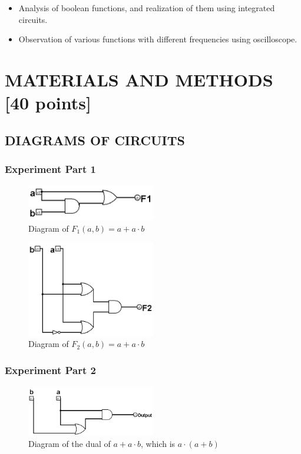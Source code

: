 \documentclass[pdftex,12pt,a4paper]{article}
\begin{document}
\begin{itemize}
\item Analysis of boolean functions, and realization of them using integrated circuits.
\item Observation of various functions with different frequencies using oscilloscope.
\end{itemize}

\section{MATERIALS AND METHODS [40 points]}

\subsection{DIAGRAMS OF CIRCUITS}
\subsubsection{Experiment Part 1}

\begin{figure}[ht]
	\centering
	\includegraphics[width=0.5\textwidth]{f1_diagram.png}	
	\caption{Diagram of \(F_1(a, b) = a + a \cdot b\)}
	\label{fig1}
\end{figure}

\begin{figure}[ht]
    \centering
	\includegraphics[width=0.5\textwidth]{f2_diagram.png}	
	\caption{Diagram of \(F_2(a, b) = a + a \cdot b\)}
	\label{fig2}
\end{figure}

\subsubsection{Experiment Part 2}
\begin{figure}[H]
	\centering
	\includegraphics[width=0.5\textwidth]{part2_diagram.png}	
	\caption{Diagram of the dual of \(a + a \cdot b\), which is \(a \cdot (a + b)\)}
	\label{fig3}
\end{figure}
\end{document}

